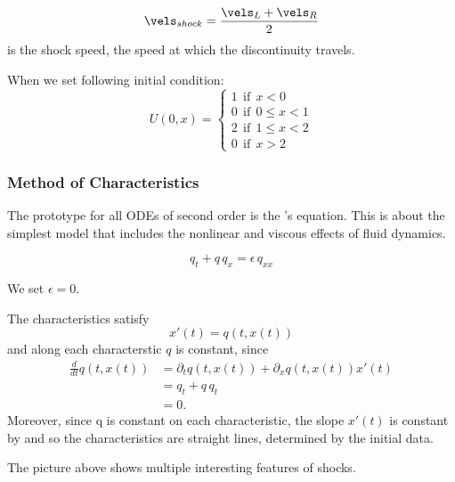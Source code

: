 \begin{equation}
   \vels_{shock} = \frac{\vels_L + \vels_R}{2}
\end{equation}
is the shock speed, the speed at which the discontinuity travels.

When we set following initial condition:
\begin{equation}
    U(0,x) = 
    \begin{cases}
        1 \ \ \text{if} \ \ x < 0 \\
        0 \ \ \text{if} \ \ 0 \leq x < 1 \\
        2 \ \ \text{if} \ \ 1 \leq x < 2 \\
        0 \ \ \text{if} \ \ x > 2    
    \end{cases}
\end{equation}

\subsubsection{Method of Characteristics}

The prototype for all ODEs of second order is the 's equation.
This is about the simplest model that includes the nonlinear and viscous
effects of fluid dynamics.

\begin{equation}
\label{eq:charact-x-t}
    q_t + q \, q_x = \epsilon \, q_{xx}
\end{equation}

We set $\epsilon = 0$.

The characteristics satisfy
\begin{equation}
    x'(t) = q(t,x(t))
\end{equation}
and along each characterstic $q$ is constant, since
\begin{align}
    \frac{d}{dt}q(t,x(t))   &= \partial_t q(t,x(t)) + \partial_x q(t,x(t)) x'(t) \\
                            &= q_t + q\,q_t \\
                            &= 0.
\end{align}
Moreover, since q is constant on each characteristic, the slope $x'(t)$ is constant
by  and so the characteristics are straight lines, determined by the initial
data.


The picture above shows multiple interesting features of shocks.

